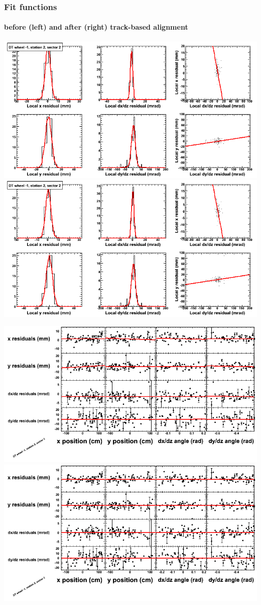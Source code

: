\documentclass[compress]{beamer}
\begin{document}
\begin{frame}
\frametitle{Fit functions}
\framesubtitle{before (left) and after (right) track-based alignment}
\includegraphics[width=0.5\linewidth]{fitfunctions_re01/MBwhBst2sec02_bellcurves.png} \includegraphics[width=0.5\linewidth]{fitfunctions_re05/MBwhBst2sec02_bellcurves.png}

\includegraphics[width=0.5\linewidth]{fitfunctions_re01/MBwhBst2sec02_polynomials.png} \includegraphics[width=0.5\linewidth]{fitfunctions_re05/MBwhBst2sec02_polynomials.png}
\end{frame}
\end{document}
